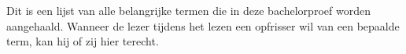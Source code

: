 

Dit is een lijst van alle belangrijke termen die in deze bachelorproef worden aangehaald. Wanneer de lezer tijdens het lezen een opfrisser wil van een bepaalde term, kan hij of zij hier terecht.

\printglossary[title=Glossary, toctitle=List of terms]

    
